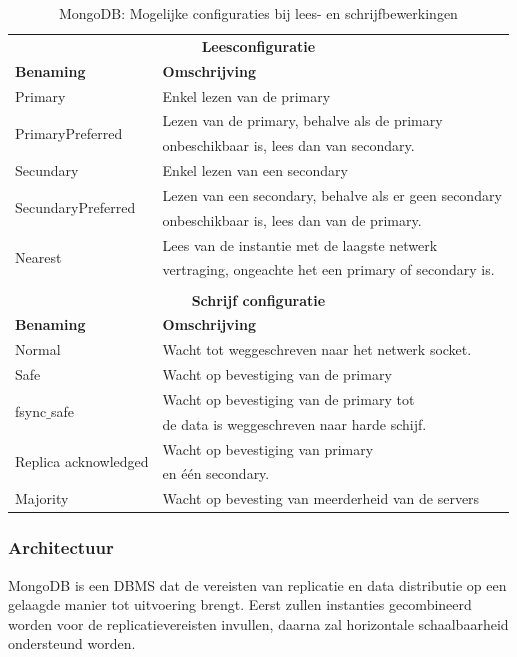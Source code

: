 \begin{table}[ht!]
	\centering
	\begin{tabular}{l|l}
		\multicolumn{2}{c}{\textbf{Leesconfiguratie}} \\ 
		\textbf{Benaming} & \textbf{Omschrijving} \\ \hline
		Primary & Enkel lezen van de primary \\
		\multirow{2}[1]{*}{PrimaryPreferred} & Lezen van de primary, behalve als de primary  \\
		& onbeschikbaar is, lees dan van secondary. \\
		Secundary & Enkel lezen van een secondary \\
		\multirow{2}[1]{*}{SecundaryPreferred} & Lezen van een secondary, behalve als er geen secondary  \\
				& onbeschikbaar is, lees dan van de primary. \\
		\multirow{2}[1]{*}{Nearest} & Lees van de instantie met de laagste netwerk \\
				& vertraging, ongeachte het een primary of secondary is. \\
		\multicolumn{2}{c}{\textbf{}} \\ 		
		
		\multicolumn{2}{c}{\textbf{Schrijf configuratie}} \\ 
		\textbf{Benaming} & \textbf{Omschrijving} \\ \hline
		Normal & Wacht tot weggeschreven naar het netwerk socket. \\
		\multirow{1}[1]{*}{Safe} & Wacht op bevestiging van de primary    \\
		
		\multirow{2}[1]{*}{fsync$\_$safe} & Wacht op bevestiging van de primary tot  \\
				& de data is weggeschreven naar harde schijf.  \\
		\multirow{2}[1]{*}{Replica acknowledged} & Wacht op bevestiging van primary  \\
				& en één secondary. \\
		\multirow{1}[1]{*}{Majority} & Wacht op bevesting van meerderheid van de servers  \\
	\end{tabular}
	\caption{MongoDB: Mogelijke configuraties bij lees- en schrijfbewerkingen}
	\label{table:mongodb-query-opties}
\end{table}

\subsubsection{Architectuur}
MongoDB is een DBMS dat de vereisten van replicatie en data distributie op een gelaagde manier tot uitvoering brengt. Eerst zullen instanties gecombineerd worden voor de replicatievereisten invullen, daarna zal horizontale schaalbaarheid ondersteund worden. 


